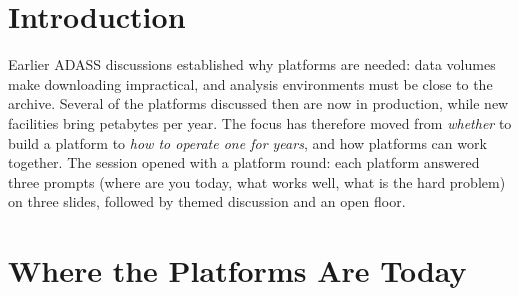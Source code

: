 \documentclass[11pt,twoside]{article}
\begin{document}
\begin{abstract}
Science platforms, which bring notebooks, batch processing and visualisation
to the data instead of moving data to users, are now the main way that large
astronomy projects expect their communities to work. This Birds of a Feather
session, held at ADASS XXXVI in Perth in November 2026, brought together the teams behind ESA Datalabs and Euclid, the Rubin
Science Platform, the SKA Regional Centre Network (SRCNet), CADC and CANFAR,
NASA Fornax, the LOFAR Long Term Archive and ALMA. Each platform described where
it is today, one design choice it would make again, and its hardest open
problem, with a question for the other platforms. We summarise the answers,
the choices that recur across platforms, and the shared open problems: work
across sites and platforms, efficient use of resources, scaling to petabytes,
identity, and sustaining services through their full lifecycle.
\end{abstract}


\section{Introduction}

Earlier ADASS discussions \citep{2020ASPC..522..363O, 2020ASPC..527..777T}
established why platforms are needed: data volumes make downloading
impractical, and analysis environments must be close to the archive. Several of
the platforms discussed then are now in production, while new facilities bring
petabytes per year. The focus has therefore moved from \emph{whether} to build a
platform to \emph{how to operate one for years}, and how platforms can work
together. The session opened with a platform round: each platform answered three
prompts (where are you today, what works well, what is the hard problem) on
three slides, followed by themed discussion and an open floor.

\section{Where the Platforms Are Today}
\end{document}

